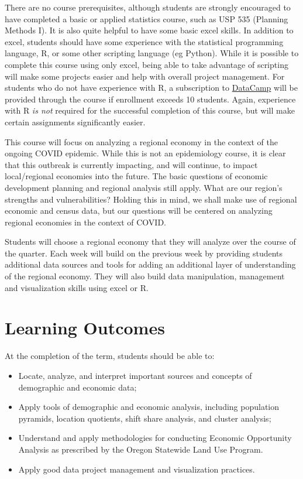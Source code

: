 \documentclass[11pt,]{article}
\begin{document}
There are no course prerequisites, although students are strongly
encouraged to have completed a basic or applied statistics course, such
as USP 535 (Planning Methods I). It is also quite helpful to have some
basic excel skills. In addition to excel, students should have some
experience with the statistical programming language, R, or some other
scripting language (eg Python). While it is possible to complete this
course using only excel, being able to take advantage of scripting will
make some projects easier and help with overall project management. For
students who do not have experience with R, a subscription to
\href{https://www.datacamp.com/}{DataCamp} will be provided through the
course if enrollment exceeds 10 students. Again, experience with R
\emph{is not} required for the successful completion of this course, but
will make certain assignments significantly easier.

This course will focus on analyzing a regional economy in the context of
the ongoing COVID epidemic. While this is not an epidemiology course, it
is clear that this outbreak is currently impacting, and will continue,
to impact local/regional economies into the future. The basic questions
of economic development planning and regional analysis still apply. What
are our region's strengths and vulnerabilities? Holding this in mind, we
shall make use of regional economic and census data, but our questions
will be centered on analyzing regional economies in the context of
COVID.

Students will choose a regional economy that they will analyze over the
course of the quarter. Each week will build on the previous week by
providing students additional data sources and tools for adding an
additional layer of understanding of the regional economy. They will
also build data manipulation, management and visualization skills using
excel or R.

\hypertarget{learning-outcomes}{%
\section{Learning Outcomes}\label{learning-outcomes}}

At the completion of the term, students should be able to:

\begin{itemize}
\item
  Locate, analyze, and interpret important sources and concepts of
  demographic and economic data;
\item
  Apply tools of demographic and economic analysis, including population
  pyramids, location quotients, shift share analysis, and cluster
  analysis;
\item
  Understand and apply methodologies for conducting Economic Opportunity
  Analysis as prescribed by the Oregon Statewide Land Use Program.
\item
  Apply good data project management and visualization practices.
\end{itemize}
\end{document}
